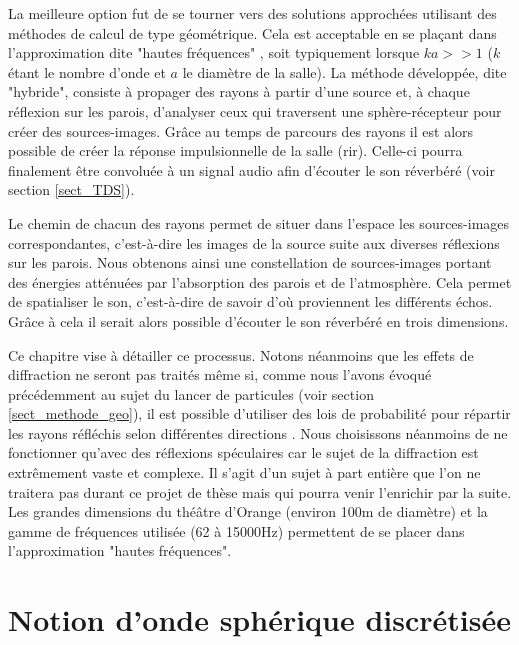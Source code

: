 La meilleure option fut de se tourner vers des solutions approchées utilisant des méthodes de calcul de type géométrique. Cela est acceptable en se plaçant dans l'approximation dite "hautes fréquences" \cite[p.116]{hautes_freq}, soit typiquement lorsque $ka >> 1$ ($k$ étant le nombre d'onde et $a$ le diamètre de la salle). La méthode développée, dite "hybride", consiste à propager des rayons à partir d'une source et, à chaque réflexion sur les parois, d'analyser ceux qui traversent une sphère-récepteur pour créer des sources-images. Grâce au temps de parcours des rayons il est alors possible de créer la réponse impulsionnelle de la salle (\gls{rir}). Celle-ci pourra finalement être convoluée à un signal audio afin d'écouter le son réverbéré (voir section \ref{sect_TDS}).

Le chemin de chacun des rayons permet de situer dans l'espace les sources-images correspondantes, c'est-à-dire les images de la source suite aux diverses réflexions sur les parois. Nous obtenons ainsi une constellation de sources-images portant des énergies atténuées par l'absorption des parois et de l'atmosphère. Cela permet de spatialiser le son, c'est-à-dire de savoir d'où proviennent les différents échos. Grâce à cela il serait alors possible d'écouter le son réverbéré en trois dimensions. %

Ce chapitre vise à détailler ce processus. Notons néanmoins que les effets de diffraction ne seront pas traités même si, comme nous l'avons évoqué précédemment au sujet du lancer de particules (voir section \ref{sect_methode_geo}), il est possible d'utiliser des lois de probabilité pour répartir les rayons réfléchis selon différentes directions \cite[p.187-199]{diffusion}. Nous choisissons néanmoins de ne fonctionner qu'avec des réflexions spéculaires car le sujet de la diffraction est extrêmement vaste et complexe. Il s'agit d'un sujet à part entière que l'on ne traitera pas durant ce projet de thèse mais qui pourra venir l'enrichir par la suite. Les grandes dimensions du théâtre d'Orange (environ 100m de diamètre) et la gamme de fréquences utilisée (62 à 15000Hz) permettent de se placer dans l'approximation "hautes fréquences".

\section{Notion d'onde sphérique discrétisée} \label{sect_discretise}

